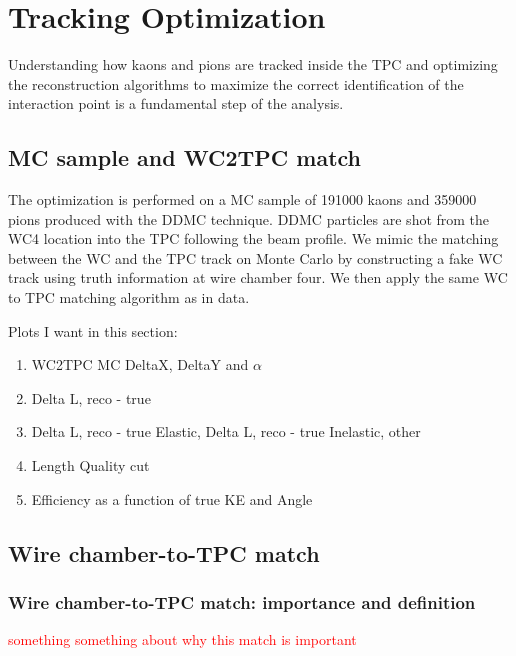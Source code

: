 \chapter{Tracking Optimization}
Understanding how kaons and pions are tracked inside the TPC and optimizing the reconstruction algorithms to maximize the correct identification of the interaction point is a fundamental step of the analysis. 


\section{MC sample and WC2TPC match}
The optimization is performed on a MC sample of 191000 kaons and 359000 pions produced with the DDMC technique. DDMC particles are shot from the WC4 location into the TPC following the beam profile.
We mimic the matching between the WC and the TPC track on Monte Carlo by constructing a fake WC track using truth information at wire chamber four. We then apply the same WC to TPC matching algorithm as in data. 

Plots I want in this section:
\begin{enumerate}
\item WC2TPC MC DeltaX, DeltaY and $\alpha$
\item Delta L, reco - true
\item Delta L, reco - true Elastic, Delta L, reco - true Inelastic, other
\item Length Quality cut
\item Efficiency as a function of true KE and Angle
\end{enumerate}





\section{Wire chamber-to-TPC match}
\subsection{Wire chamber-to-TPC match: importance and definition}
\textcolor{red}{something something about why this match is important}


